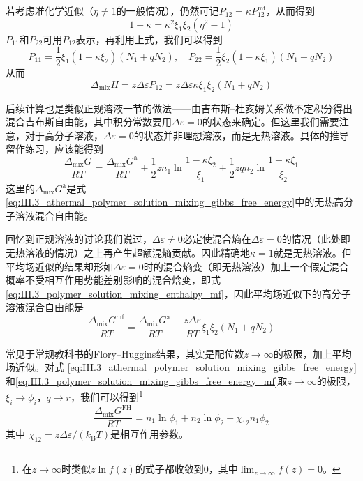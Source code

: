 \documentclass[main.tex]{subfiles}
\begin{document}
若考虑准化学近似（$\eta\neq 1$的一般情况），仍然可记$P_{12}=\kappa P_{12}^\text{mf}$，从而得到
\[1-\kappa=\kappa^2\xi_1\xi_2\left(\eta^2-1\right)\]
$P_{11}$和$P_{22}$可用$P_{12}$表示，再利用上式，我们可以得到
\[P_{11}=\frac{1}{2}\xi_1\left(1-\kappa\xi_2\right)\left(N_1+qN_2\right),\quad P_{22}=\frac{1}{2}\xi_2\left(1-\kappa\xi_1\right)\left(N_1+qN_2\right)\]
从而
\begin{equation}\label{III.3 mixing_enthalpy_with_kappa}
    \Delta_\text{mix}H=z\Delta\varepsilon P_{12}=z\Delta\varepsilon\kappa\xi_1\xi_2\left(N_1+qN_2\right)
\end{equation}

后续计算也是类似正规溶液一节的做法——由吉布斯--杜亥姆关系做不定积分得出混合吉布斯自由能，其中积分常数要用$\Delta\varepsilon=0$的状态来确定。但这里我们需要注意，对于高分子溶液，$\Delta\varepsilon=0$的状态并非理想溶液，而是无热溶液。具体的推导留作练习，应该能得到
\begin{equation}\label{eq:III.3_polymer_solution_mixing_gibbs_free_energy}
    \frac{\Delta_\text{mix}G}{RT} = \frac{\Delta_\text{mix}G^\text{a}}{RT} + \frac{1}{2} z n_1 \ln \frac{1-\kappa\xi_2}{\xi_1} + \frac{1}{2}z q n_2 \ln \frac{1-\kappa\xi_1}{\xi_2}
\end{equation}
这里的$\Delta_\text{mix}G^\text{a}$是式\eqref{eq:III.3_athermal_polymer_solution_mixing_gibbs_free_energy}中的无热高分子溶液混合自由能。

回忆到正规溶液的讨论我们说过，$\Delta\varepsilon\neq 0$必定使混合熵在$\Delta\varepsilon=0$的情况（此处即无热溶液的情况）之上再产生超额混熵贡献。因此精确地$\kappa=1$就是无热溶液。但平均场近似的结果却形如$\Delta\varepsilon=0$时的混合熵变（即无热溶液）加上一个假定混合概率不受相互作用势能差别影响的混合焓变，即式\eqref{eq:III.3_polymer_solution_mixing_enthalpy_mf}，因此平均场近似下的高分子溶液混合自由能是
\begin{equation}
    \label{eq:III.3_polymer_solution_mixing_gibbs_free_energy_mf}
    \frac{\Delta_\text{mix}G^\text{mf}}{RT}=\frac{\Delta_\text{mix}G^\text{a}}{RT}+\frac{z\Delta\varepsilon}{RT}\xi_1\xi_2\left(N_1+qN_2\right)
\end{equation}

常见于常规教科书的Flory--Huggins结果，其实是配位数$z\rightarrow\infty$的极限，加上平均场近似。对式
\eqref{eq:III.3_athermal_polymer_solution_mixing_gibbs_free_energy}和\eqref{eq:III.3_polymer_solution_mixing_gibbs_free_energy_mf}取$z\to\infty$的极限，$\xi_i\to \phi_i$，$q\to r$，我们可以得到\footnote{在$z\to\infty$时类似$z\ln f\left(z\right)$的式子都收敛到0，其中$\lim_{z\to\infty}f\left(z\right)=0$。}
\begin{equation}\label{eq:III.3_polymer_solution_mixing_gibbs_free_energy_flory_huggins}
    \frac{\Delta_\text{mix}G^\text{FH}}{RT}=n_1\ln\phi_1+n_2\ln\phi_2+\chi_{12}n_1\phi_2
\end{equation}
其中
$\chi_{12}=z\Delta\varepsilon/\left(k_\text{B}T\right)$是相互作用参数。
\end{document}
